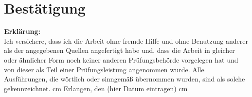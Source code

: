 
\chapter*{Bestätigung}


\textbf{Erklärung:}\\

Ich versichere, dass ich die Arbeit ohne fremde Hilfe und ohne Benutzung anderer als der angegebenen Quellen angefertigt habe und, dass die Arbeit in gleicher oder ähnlicher Form noch keiner anderen Prüfungsbehörde vorgelegen hat und von dieser als Teil einer Prüfungsleistung angenommen wurde. Alle Ausführungen, die wörtlich oder sinngemäß übernommen wurden, sind als solche gekennzeichnet.
 cm
Erlangen, den (hier Datum eintragen)%
 \underline{\hspace{7cm} }
 cm
